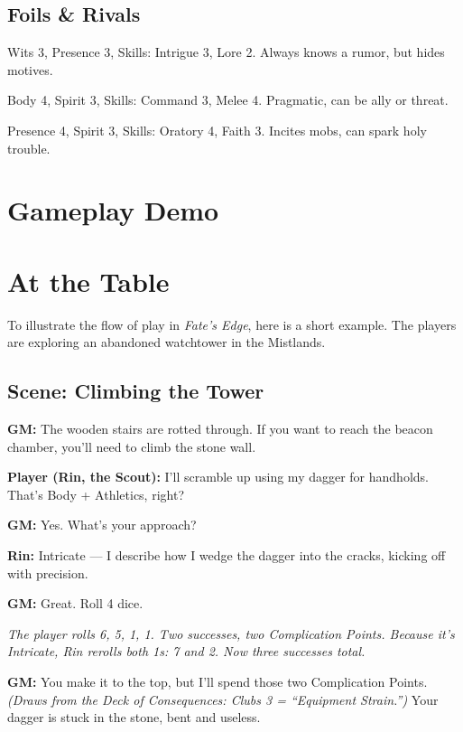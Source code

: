 \documentclass[11pt]{article}
\begin{document}
\subsection{Foils \& Rivals}
\begin{description}[leftmargin=2cm]
  \item[Ambitious Scribe] Wits 3, Presence 3, Skills: Intrigue 3, Lore 2. Always knows a rumor, but hides motives.  
  \item[Mercenary Captain] Body 4, Spirit 3, Skills: Command 3, Melee 4. Pragmatic, can be ally or threat.  
  \item[Flame Preacher] Presence 4, Spirit 3, Skills: Oratory 4, Faith 3. Incites mobs, can spark holy trouble.  
\end{description}

\section{Gameplay Demo}

\section*{At the Table}
To illustrate the flow of play in \textit{Fate’s Edge}, here is a short example.  
The players are exploring an abandoned watchtower in the Mistlands.  

\subsection*{Scene: Climbing the Tower}

\textbf{GM:} The wooden stairs are rotted through. If you want to reach the beacon chamber, you’ll need to climb the stone wall.  

\textbf{Player (Rin, the Scout):} I’ll scramble up using my dagger for handholds. That’s Body + Athletics, right?  

\textbf{GM:} Yes. What’s your approach?  

\textbf{Rin:} Intricate — I describe how I wedge the dagger into the cracks, kicking off with precision.  

\textbf{GM:} Great. Roll 4 dice.  

\textit{The player rolls 6, 5, 1, 1. Two successes, two Complication Points. Because it’s Intricate, Rin rerolls both 1s: 7 and 2. Now three successes total.}  

\textbf{GM:} You make it to the top, but I’ll spend those two Complication Points.  
\textit{(Draws from the Deck of Consequences: Clubs 3 = “Equipment Strain.”)}  
Your dagger is stuck in the stone, bent and useless.  
\end{document}
